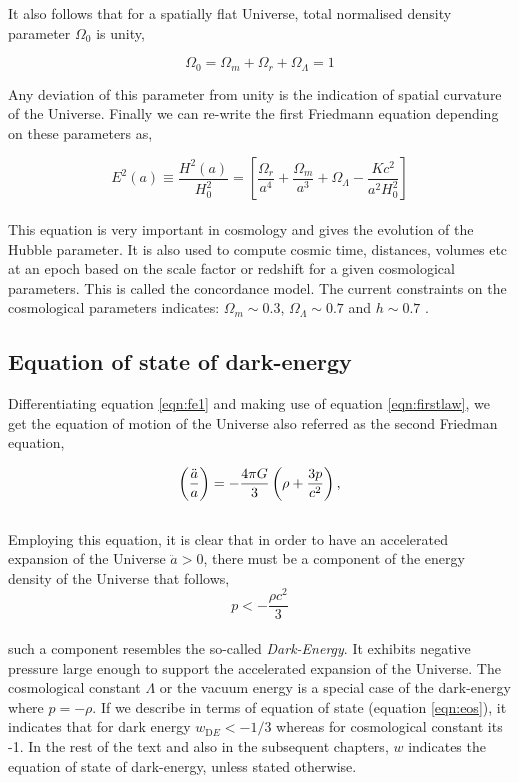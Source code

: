 It also follows that for a spatially flat Universe, total normalised 
density parameter $\Omega_0$ is unity,

\begin{equation}
	\Omega_0 = \Omega_m + \Omega_r + \Omega_{\Lambda} = 1
\end{equation}

Any deviation of this 
parameter from unity is the indication of spatial curvature of the Universe.
Finally we can re-write the first Friedmann equation depending on these parameters as,

\begin{equation}
	E^2(a) \equiv \dfrac{H^2(a)}{H_0^2} = \left[\dfrac{\Omega_r}{a^4}
	 + \dfrac{\Omega_m}{a^3} +
	 \Omega_{\Lambda} - \dfrac{Kc^2}{a^2H_0^2}  \right]
	 \label{eqn:hubbleparameter}
\end{equation}
\\
This equation is very important in cosmology and gives the evolution of the 
Hubble parameter. It is also used to compute cosmic time, distances, volumes
etc at an epoch based on the scale factor or redshift for a given cosmological
parameters. This is called the concordance model. The current constraints on the
cosmological parameters indicates: $\Omega_m \sim 0.3$, $\Omega_{\Lambda} \sim 0.7$
and $h \sim 0.7$ \citep{2015arXiv150201589P}.


\subsection{Equation of state of dark-energy}

Differentiating equation \ref{eqn:fe1} and making use of equation
\ref{eqn:firstlaw}, we get the equation of motion of the Universe
also referred as the second Friedman equation,

\begin{equation}
\centering
		\left( \dfrac{\ddot{a}}{a} \right) = -\dfrac{4 \pi G}{3} 
			\left( \rho + \dfrac{3p}{c^2} \right),
\label{eqn:fe2}
\end{equation}
\\
Employing this equation, it is clear that in order to have an 
accelerated expansion of the Universe $\ddot{a}>0$,
there must be a component of the energy density of the Universe that follows,
\begin{equation}
	p < -\dfrac{\rho c^2}{3} 
\end{equation}
\\
such a component resembles the so-called {\it Dark-Energy}. It exhibits 
negative pressure large enough to support the accelerated expansion of the
Universe. The cosmological constant $\Lambda$  or the vacuum energy is a 
special case of the dark-energy where $p=-\rho$. If we describe in terms 
of equation of state (equation \ref{eqn:eos}), it indicates that for 
dark energy $w_{\mathrm DE}<-1/3$ whereas for cosmological constant its -1.
In the rest of the text and also in the subsequent chapters, $w$ indicates
the equation of state of dark-energy, unless stated otherwise.

